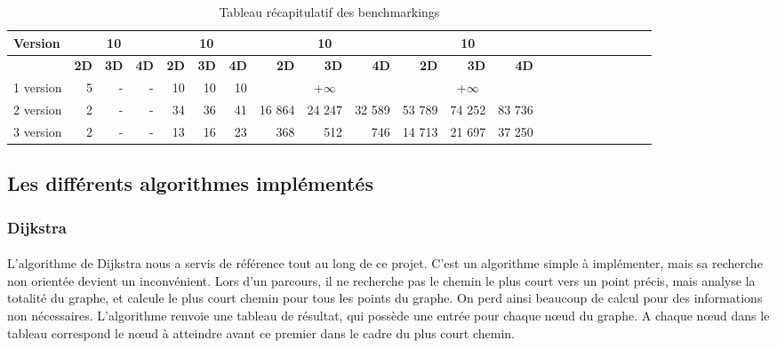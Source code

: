 \documentclass[pidr]{tnreport}
\begin{document}
\begin{table}[h]
\begin{center}
   \begin{tabular}{| l | r | r | r | r | r | r | r | r | r | r | r | r | r | r | r | r | r | r | r | r | r |}
     \hline
      \textbf{Version} & \multicolumn{3}{c|}{\textbf{10\up{2}}} & \multicolumn{3}{c|}{\textbf{10\up{4}}} & \multicolumn{3}{c|}{\textbf{10\up{6}}} & \multicolumn{3}{c|}{\textbf{10\up{7}}} \\
     \hline
     \cline{2-5}
    & \textbf{2D} & \textbf{3D} & \textbf{4D} & \textbf{2D} & \textbf{3D} & \textbf{4D} & \textbf{2D} & \textbf{3D} & \textbf{4D} & \textbf{2D} & \textbf{3D} & \textbf{4D}\\ \hline
     1\up{ère} version & 5 & - & - & ~10\up{7} & ~10\up{8} & ~10\up{8} & \multicolumn{3}{c|}{+$\infty$}  & \multicolumn{3}{c|}{+$\infty$}   \\ \hline
     2\up{ème} version & 2 & - & - & 34 & 36 & 41 & 16 864 & 24 247 & 32 589 & 53 789 & 74 252 & 83 736  \\ \hline
     3\up{ème} version & 2 & - & - & 13 & 16 & 23 & 368 & 512 & 746  & 14 713 & 21 697 & 37 250 \\ \hline
   \end{tabular}
 \end{center}
 \caption{Tableau récapitulatif des benchmarkings}
\end{table}

	\subsection{Les différents algorithmes implémentés}
		\subsubsection{Dijkstra}			
\paragraph{}
L'algorithme de Dijkstra nous a servis de référence tout au long de ce projet. C'est un algorithme simple à implémenter, mais sa recherche non orientée devient un inconvénient. Lors d'un parcours, il ne recherche pas le chemin le plus court vers un point précis, mais analyse la totalité du graphe, et calcule le plus court chemin pour tous les points du graphe. On perd ainsi beaucoup de calcul pour des informations non nécessaires. L’algorithme renvoie une tableau de résultat, qui possède une entrée pour chaque nœud du graphe. A chaque nœud dans le tableau correspond le nœud à atteindre avant ce premier dans le cadre du plus court chemin.
\end{document}

